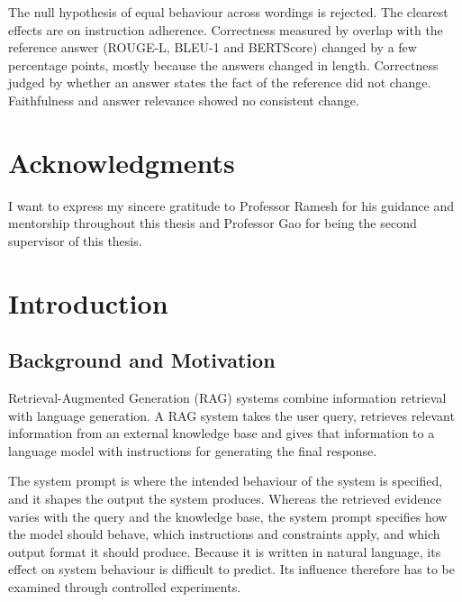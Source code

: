 \documentclass[12pt,a4paper,oneside]{scrreprt}
\begin{document}
The null hypothesis of
equal behaviour across wordings is rejected. The clearest effects are on
instruction adherence. Correctness measured by overlap with the reference answer (ROUGE-L, BLEU-1 and BERTScore) changed by a few percentage points, mostly because the answers changed in length. Correctness judged by whether an answer states the fact of the reference did not change. Faithfulness and answer relevance showed no consistent change. 


\chapter*{Acknowledgments}
I want to express my sincere gratitude to Professor Ramesh for his guidance and mentorship throughout this thesis and Professor Gao for being the second supervisor of this thesis.

\tableofcontents

\cleardoublepage
{}

\chapter{Introduction}

\section{Background and Motivation}

Retrieval-Augmented Generation (RAG) systems combine information retrieval with
language generation. A RAG
system takes the user query, retrieves relevant information from an external
knowledge base and gives that information to a
language model with instructions for generating the final response.

The system prompt is where the intended behaviour of the system is specified, and it shapes the output the system produces. Whereas the retrieved evidence varies with the query and the knowledge base, the system prompt specifies how the model should behave, which instructions and constraints
apply, and which output format it should produce. Because it is written in natural language, its effect on system behaviour is difficult to
predict. Its influence therefore has to be examined
through controlled experiments.
\end{document}
